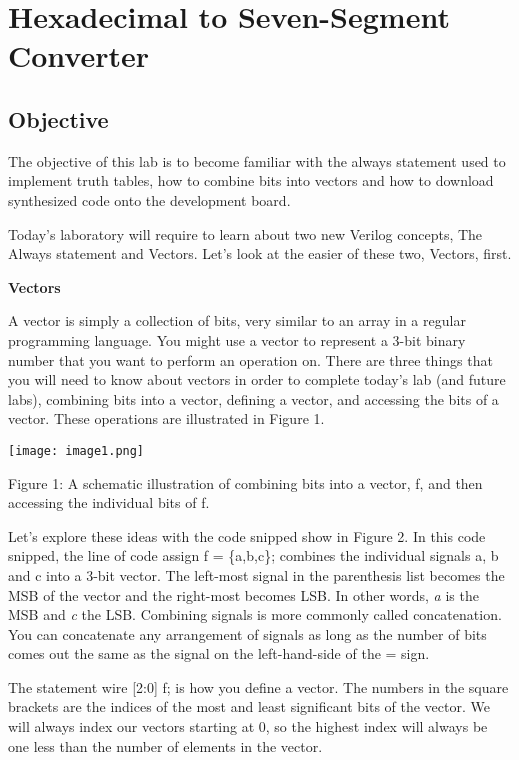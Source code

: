 \chapter{Hexadecimal to Seven-Segment Converter}
\label{HexToSeven}
\graphicspath{ {./Lab02HexToSeven/Fig} }


\hypertarget{objective}{%
\section{Objective }
\label{hex2Seven:objective}}

The objective of this lab is to become familiar with the always
statement used to implement truth tables, how to combine bits into
vectors and how to download synthesized code onto the development board.

Today's laboratory will require to learn about two new Verilog concepts,
The Always statement and Vectors. Let's look at the easier of these two,
Vectors, first.

\textbf{Vectors}

A vector is simply a collection of bits, very similar to an array in a
regular programming language. You might use a vector to represent a
3-bit binary number that you want to perform an operation on. There are
three things that you will need to know about vectors in order to
complete today's lab (and future labs), combining bits into a vector,
defining a vector, and accessing the bits of a vector. These operations
are illustrated in Figure 1.

\texttt{[image: image1.png]}

Figure 1: A schematic illustration of combining bits into a vector, f,
and then accessing the individual bits of f.

Let's explore these ideas with the code snipped show in Figure 2. In
this code snipped, the line of code assign f = \{a,b,c\}; combines the
individual signals a, b and c into a 3-bit vector. The left-most signal
in the parenthesis list becomes the MSB of the vector and the right-most
becomes LSB. In other words, \emph{a} is the MSB and \emph{c} the LSB.
Combining signals is more commonly called concatenation. You can
concatenate any arrangement of signals as long as the number of bits
comes out the same as the signal on the left-hand-side of the = sign.

The statement wire {[}2:0{]} f; is how you define a vector. The numbers
in the square brackets are the indices of the most and least significant
bits of the vector. We will always index our vectors starting at 0, so
the highest index will always be one less than the number of elements in
the vector.

